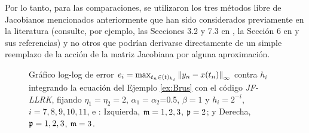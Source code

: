 Por lo tanto, para las comparaciones, se utilizaron los tres métodos libre de Jacobianos mencionados anteriormente que han sido considerados previamente en la literatura (consulte, por ejemplo, las Secciones 3.2 y 7.3 en \cite{hochbruck1998exponential}, la Sección 6 en \cite{einkemmer2017performance} y sus referencias) y no otros que podrían derivarse directamente de un simple reemplazo de la acción de la matriz Jacobiana por alguna aproximación.

\vspace{0.5cm}

\begin{figure}[htb]
	\centering
	\caption{Gráfico log-log de error ${e_i=\max_{t_n\in(t)_{h_i}}\left\lVert y_n-x(t_n) \right\rVert_\infty}$ contra $h_i$ integrando la ecuación del Ejemplo \ref{ex:Brus} con el código \textit{JF-LLRK}, fijando $\eta_1=\eta_2=2$, $\alpha_1=\alpha_2$=0.5, $\beta=1$ y $h_i=2^{-i}$, $i=7,8,9,10,11$, e : Izquierda, $\mathfrak{m}=1,2,3$, $\mathfrak{p}=2$; y Derecha, $\mathfrak{p}=1,2,3$, $\mathfrak{m}=3$.} \label{Fig1}
\end{figure}

\vspace{0.5cm}


